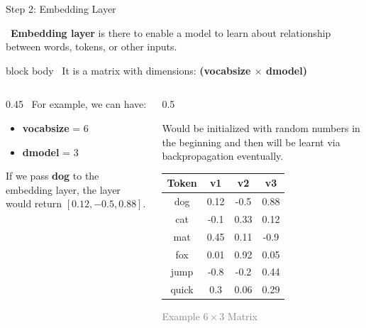 \documentclass[aspectratio=169,xcolor=dvipsnames,svgnames,x11names,fleqn]{beamer}
\begin{document}
\begin{frame}{Step 2: Embedding Layer}


    
    \begin{tcolorbox}[colback=embedSlate, colframe=embedSlate, arc=1mm, fontupper=\color{white}]
        \small \faBrain \ \textbf{Embedding layer} is there to enable a model to learn about relationship between words, tokens, or other inputs.
    \end{tcolorbox}


    \begin{center}
        \begin{beamercolorbox}[wd=0.8\textwidth, sep=8pt, center, rounded=true]{block body}
            \small \faArrowsAlt \ It is a matrix with dimensions: 
            \large \textbf{(\textcolor{embedEmerald}{vocabsize} $\times$ \textcolor{embedSlate}{dmodel})}
        \end{beamercolorbox}
    \end{center}


    \begin{columns}[T]
        \begin{column}{0.45\textwidth}
            \small \faInfoCircle \ For example, we can have:
            \begin{itemize}
                \item \textbf{vocabsize} = 6
                \item \textbf{dmodel} = 3
            \end{itemize}
            
             If we pass \textbf{dog} to the embedding layer, the layer would return $[0.12, -0.5, 0.88]$.
             
        \end{column}
        
        \begin{column}{0.5\textwidth}
            \centering
            \scriptsize

Would be initialized with random numbers in the beginning and then will be learnt via backpropagation eventually.            
            
            \begin{tabular}{|c|c|c|c|}
                \hline
                \rowcolor{embedSlate!10} \textbf{Token} & \textbf{v1} & \textbf{v2} & \textbf{v3} \\ \hline
                dog & 0.12 & -0.5 & 0.88 \\ \hline
                cat & -0.1 & 0.33 & 0.12 \\ \hline
                mat & 0.45 & 0.11 & -0.9 \\ \hline
                fox & 0.01 & 0.92 & 0.05 \\ \hline
                jump & -0.8 & -0.2 & 0.44 \\ \hline
                 quick & 0.3 & 0.06 & 0.29 \\ \hline
            \end{tabular}
            \centerline{{\tiny \textcolor{gray}{Example $6 \times 3$ Matrix}}
            }
            

\end{column}
\end{columns}
\end{frame}
\end{document}
